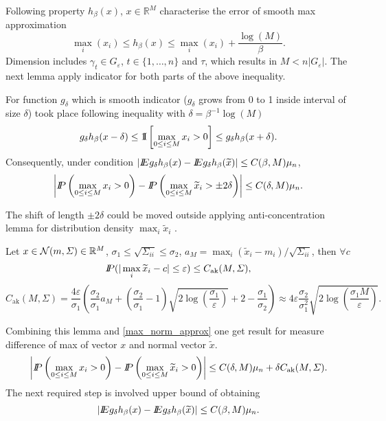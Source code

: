 Following property $h_\beta (x)$, $x \in \mathbb{R}^M$ characterise the error of smooth max approximation
\[
 \max_i(x_i)  \leq  h_\beta (x) \leq \max_i(x_i)  +  \frac{\log(M)}{\beta}.
\] 
Dimension includes $\gamma_t \in G_\varepsilon$, $t \in \{1,\ldots,n\}$ and $\tau$, which results in $M < n |G_\varepsilon|$. 
The next lemma apply indicator for  both  parts of the above inequality. 
\begin{lemma}
For function $g_{\delta}$ which is smooth indicator ($g_{\delta}$ grows from 0 to 1 inside interval of size ${\delta}$) took place following inequality with $\delta = \beta^{-1} \log(M)$
\[
g_{\delta} h_\beta (x - \delta) \leq \Ind \left[\max_{0\leq i \leq M} x_i > 0 \right]  \leq g_{\delta} h_\beta (x + \delta).
\]
Consequently, under condition $\vert \E g_{\delta} h_\beta(x)  -  \E g_{\delta} h_\beta(\widetilde{x}) \vert \leq C(\beta, M) \mu_n$,
\begin{equation}
\label{max_norm_approx}
\left| \P \left(\max_{0\leq i \leq M} x_i > 0 \right)  -  \P  \left(\max_{0\leq i \leq M} \widetilde{x}_i > \pm 2\delta \right) \right| \leq 
C(\delta, M) \mu_n.
\end{equation}
\end{lemma}

The shift of length $\pm 2\delta$ could be moved outside applying anti-concentration lemma for distribution density $\max_{i} \widetilde{x}_i$ .
 
\begin{lemma}
Let $x \in \ND (m, \Sigma) \in \mathbb{R}^M $,  $\sigma_1 \leq  \sqrt{\Sigma_{ii}} \leq  \sigma_2$, $a_M = \max_i (\widetilde{x}_i - m_i) /\sqrt{ \Sigma_{ii}}$, then $\forall c$
 \[
 \P(\vert \max_{i} \widetilde{x}_i - c \vert \leq  \varepsilon)
 \leq  C_{\text{ak}}(M, \Sigma),
 \]
 \[
 C_{\text{ak}}(M, \Sigma) =  \frac{4 \varepsilon}{\sigma_1} \left( \frac{\sigma_2}{\sigma_1} a_M +  \left(\frac{\sigma_2}{\sigma_1} - 1\right) \sqrt{2 \log \left(\frac{\sigma_1}{\varepsilon} \right)}+2  - \frac{\sigma_1}{\sigma_2}\right) \approx 4 \varepsilon \frac{\sigma_2}{\sigma_1^2} \sqrt{2 \log \left(  \frac{ \sigma_1 M}{\varepsilon} \right)}.
 \]
\end{lemma}
Combining this lemma and \ref{max_norm_approx} one get result for measure difference of max of vector $x$ and  normal vector $\tilde{x}$.  
\begin{equation}
\label{max_norm_approx_1}
\left| \P \left(\max_{0\leq i \leq M} x_i > 0 \right)  -  \P  \left(\max_{0\leq i \leq M} \widetilde{x}_i > 0 \right) \right| \leq 
C(\delta, M) \mu_n +  \delta C_{\text{ak}}(M, \Sigma).
\end{equation}
The next required step is involved upper bound of obtaining
\[
\vert \E g_{\delta} h_\beta(x)  -  \E g_{\delta} h_\beta(\widetilde{x}) \vert \leq C(\beta, M) \mu_n.
\] 

